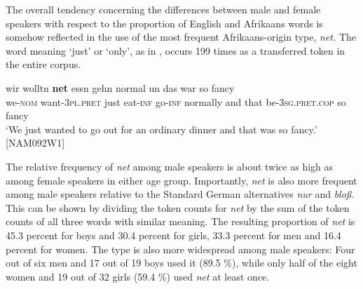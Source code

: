 \documentclass[output=paper]{langsci/langscibook}
\begin{document}
  
\begin{table} 
\caption{Distribution and proportion of English types and tokens in terms of dictionary attestation (att.)}
\label{tab:bracke:8}
\end{table}  

The overall tendency concerning the differences between male and female speakers with respect to the proportion of English and Afrikaans words is somehow reflected in the use of the most frequent Afrikaans-origin type, \textit{net.} The word meaning ‘just’ or ‘only’, as in , occurs 199 times as a transferred token in the entire corpus.

\ea
\label{ex:bracke:8}
\gll wir wolltn \textbf{net} essn gehn normal un das war so fancy\\
     we-\textsc{nom} want-\textsc{3pl.pret} just eat-\textsc{inf} go-\textsc{inf} normally and that be-\textsc{3sg.pret.cop} so fancy\\
\glt `We just wanted to go out for an ordinary dinner and that was so fancy.' {[}NAM092W1{]}
\z

The relative frequency of \textit{net} among male speakers is about twice as high as among female speakers in either age group. Importantly, \textit{net} is also more frequent among male speakers relative to the Standard German alternatives \textit{nur} and \textit{bloß.} This can be shown by dividing the token counts for \textit{net} by the sum of the token counts of all three words with similar meaning. The resulting proportion of \textit{net} is 45.3 percent for boys and 30.4 percent for girls, 33.3 percent for men and 16.4 percent for women. The type is also more widespread among male speakers: Four out of six men and 17 out of 19 boys used it (89.5 \%), while only half of the eight women and 19 out of 32 girls (59.4 \%) used \textit{net} at least once.
\end{document}

